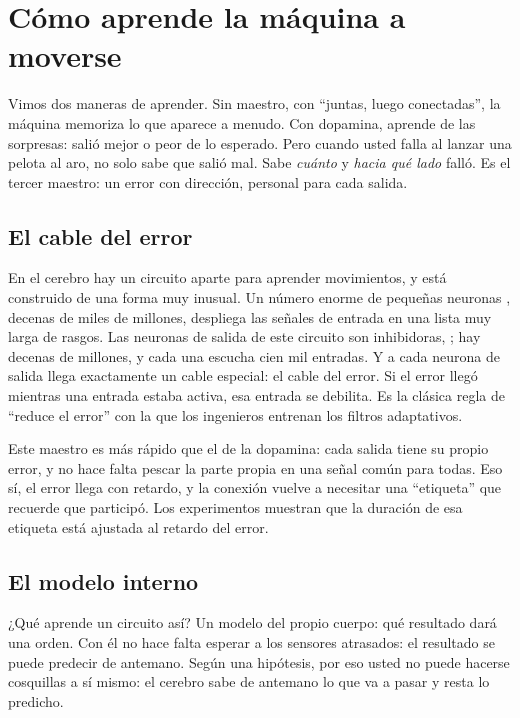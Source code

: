 \chapter{Cómo aprende la máquina a moverse}

Vimos dos maneras de aprender. Sin maestro, con “juntas, luego conectadas”, la máquina memoriza lo que aparece a menudo. Con dopamina, aprende de las sorpresas: salió mejor o peor de lo esperado. Pero cuando usted falla al lanzar una pelota al aro, no solo sabe que salió mal. Sabe \emph{cuánto} y \emph{hacia qué lado} falló. Es el tercer maestro: un error con dirección, personal para cada salida.

\section*{El cable del error}

En el cerebro hay un circuito aparte para aprender movimientos, y está construido de una forma muy inusual. Un número enorme de pequeñas neuronas , decenas de miles de millones, despliega las señales de entrada en una lista muy larga de rasgos. Las neuronas de salida de este circuito son inhibidoras, ; hay decenas de millones, y cada una escucha cien mil entradas. Y a cada neurona de salida llega exactamente un cable especial: el cable del error. Si el error llegó mientras una entrada estaba activa, esa entrada se debilita. Es la clásica regla de “reduce el error” con la que los ingenieros entrenan los filtros adaptativos.


Este maestro es más rápido que el de la dopamina: cada salida tiene su propio error, y no hace falta pescar la parte propia en una señal común para todas. Eso sí, el error llega con retardo, y la conexión vuelve a necesitar una “etiqueta” que recuerde que participó. Los experimentos muestran que la duración de esa etiqueta está ajustada al retardo del error.

\section*{El modelo interno}

¿Qué aprende un circuito así? Un modelo del propio cuerpo: qué resultado dará una orden. Con él no hace falta esperar a los sensores atrasados: el resultado se puede predecir de antemano. Según una hipótesis, por eso usted no puede hacerse cosquillas a sí mismo: el cerebro sabe de antemano lo que va a pasar y resta lo predicho.

